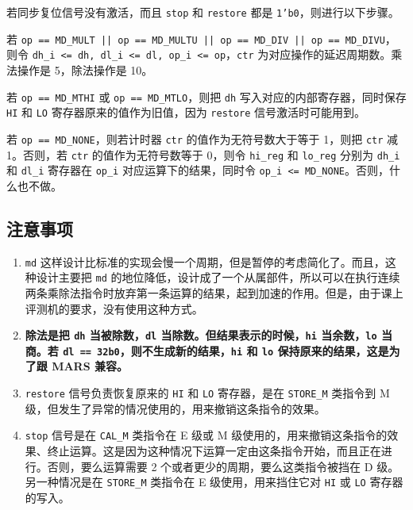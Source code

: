 \documentclass[12pt,AutoFakeBold,AutoFakeSlant]{article}
\providecommand{\tightlist}{%
  \setlength{\itemsep}{0pt}\setlength{\parskip}{0pt}}
\newcommand{\ms}[1]{\texttt{#1}}
\begin{document}
若同步复位信号没有激活，而且 \ms{stop} 和 \ms{restore} 都是 \ms{1'b0}，则进行以下步骤。

若 \texttt{op == MD\_MULT || op == MD\_MULTU || op == MD\_DIV || op == MD\_DIVU}，则令 \texttt{dh\_i <= dh, dl\_i <= dl, op\_i <= op}，\texttt{ctr} 为对应操作的延迟周期数。乘法操作是 5，除法操作是 10。

若 \texttt{op == MD\_MTHI} 或 \texttt{op == MD\_MTLO}，则把 \texttt{dh} 写入对应的内部寄存器，同时保存 \ms{HI} 和 \ms{LO} 寄存器原来的值作为旧值，因为 \ms{restore} 信号激活时可能用到。

若 \texttt{op == MD\_NONE}，则若计时器 \texttt{ctr} 的值作为无符号数大于等于 1，则把 \texttt{ctr} 减 1。否则，若 \texttt{ctr} 的值作为无符号数等于 0，则令 \texttt{hi\_reg} 和 \texttt{lo\_reg} 分别为 \texttt{dh\_i} 和 \texttt{dl\_i} 寄存器在 \texttt{op\_i} 对应运算下的结果，同时令 \texttt{op\_i <= MD\_NONE}。否则，什么也不做。

\hypertarget{ux6ce8ux610fux4e8bux9879-5}{%
\subsection{注意事项}\label{ux6ce8ux610fux4e8bux9879-5}}

\begin{enumerate}
\def\labelenumi{\arabic{enumi}.}
\tightlist
\item
  \texttt{md} 这样设计比标准的实现会慢一个周期，但是暂停的考虑简化了。而且，这种设计主要把 \texttt{md} 的地位降低，设计成了一个从属部件，所以可以在执行连续两条乘除法指令时放弃第一条运算的结果，起到加速的作用。但是，由于课上评测机的要求，没有使用这种方式。
\item
  \textbf{除法是把 \texttt{dh} 当被除数，\texttt{dl}
  当除数。但结果表示的时候，\texttt{hi} 当余数，\texttt{lo} 当商。若
  \texttt{dl\ ==\ 32\textquotesingle{}b0}，则不生成新的结果，\texttt{hi}
  和 \texttt{lo} 保持原来的结果，这是为了跟 MARS
  兼容。}
\item
  \ms{restore} 信号负责恢复原来的 \ms{HI} 和 \ms{LO} 寄存器，是在 \ms{STORE\_M} 类指令到 M 级，但发生了异常的情况使用的，用来撤销这条指令的效果。
\item
  \ms{stop} 信号是在 \ms{CAL\_M} 类指令在 E 级或 M 级使用的，用来撤销这条指令的效果、终止运算。这是因为这种情况下运算一定由这条指令开始，而且正在进行。否则，要么运算需要 2 个或者更少的周期，要么这类指令被挡在 D 级。另一种情况是在 \ms{STORE\_M} 类指令在 E 级使用，用来挡住它对 \ms{HI} 或 \ms{LO} 寄存器的写入。
\end{enumerate}
\end{document}
